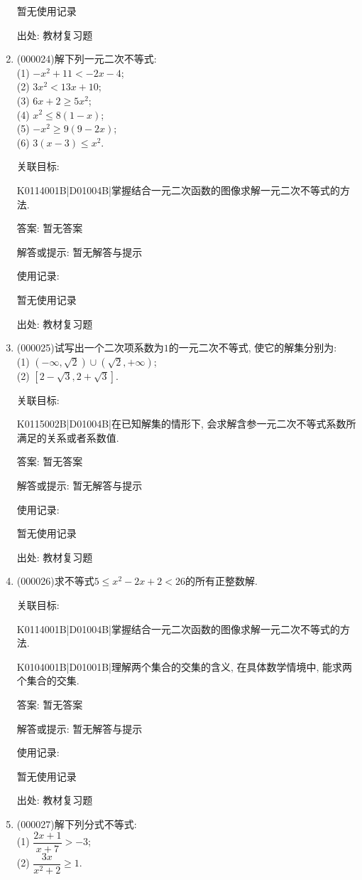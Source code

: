 \documentclass[10pt,a4paper]{article}
\begin{document}
\begin{enumerate}[1.]
暂无使用记录


出处: 教材复习题
\item { (000024)}解下列一元二次不等式:\\
(1) $-x^2+11<-2x-4$;\\
(2) $3x^2<13x+10$;\\
(3) $6x+2\ge 5x^2$;\\
(4) $x^2\le 8(1-x)$;\\
(5) $-x^2\ge 9(9-2x)$;\\
(6) $3(x-3)\le x^2$.


关联目标:

K0114001B|D01004B|掌握结合一元二次函数的图像求解一元二次不等式的方法.

答案: 暂无答案

解答或提示: 暂无解答与提示

使用记录:

暂无使用记录


出处: 教材复习题
\item { (000025)}试写出一个二次项系数为$1$的一元二次不等式, 使它的解集分别为:\\
(1) $(-\infty, \sqrt 2)\cup  (\sqrt 2, +\infty)$;\\
(2) $[2-\sqrt 3, 2+\sqrt 3]$.


关联目标:

K0115002B|D01004B|在已知解集的情形下, 会求解含参一元二次不等式系数所满足的关系或者系数值.

答案: 暂无答案

解答或提示: 暂无解答与提示

使用记录:

暂无使用记录


出处: 教材复习题
\item { (000026)}求不等式$5\le x^2-2x+2<26$的所有正整数解.


关联目标:

K0114001B|D01004B|掌握结合一元二次函数的图像求解一元二次不等式的方法.

K0104001B|D01001B|理解两个集合的交集的含义, 在具体数学情境中, 能求两个集合的交集.

答案: 暂无答案

解答或提示: 暂无解答与提示

使用记录:

暂无使用记录


出处: 教材复习题
\item { (000027)}解下列分式不等式:\\
(1) $\dfrac{2x+1}{x+7}>-3$;\\
(2) $\dfrac{3x}{x^2+2}\ge 1$.



\end{enumerate}
\end{document}
